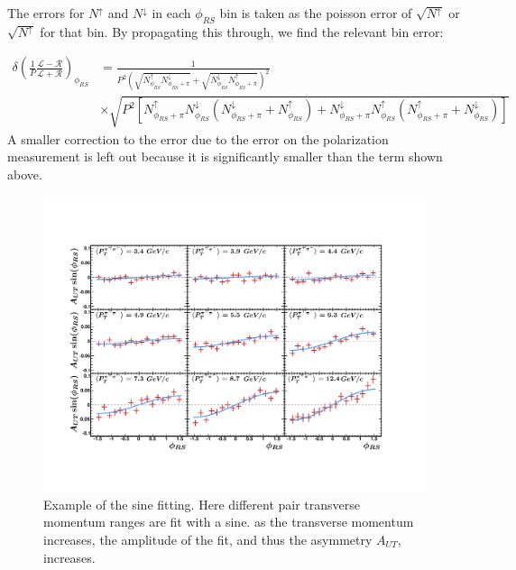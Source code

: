 \documentclass[abstract = on,listof=totoc, bibliography=totoc]{scrreprt}
\newcommand{\phirs}{\phi_{RS}}
\newcommand{\ptpair}{P_{T}^{\pi^+\pi^-}}
\newcommand{\pip}{\pi^+}
\newcommand{\pim}{\pi^-}
\newcommand{\pair}{$\pip\pim$ }
\newcommand{\nup}{N^\uparrow}
\newcommand{\ndw}{N^\downarrow}
\begin{document}
The errors for $N^\uparrow$ and $N^\downarrow$ in each $\phirs$ bin is taken as the poisson error of $\sqrt{N^\uparrow}$ or $\sqrt{N^\uparrow}$ for that bin. By propagating this through, we find the relevant bin error:

\begin{align}
\delta\left(\frac{1}{P}\frac{\mathcal{L} - \mathcal{R}}{\mathcal{L} + \mathcal{R}}\right)_{\phirs} & = \frac{1}{P^2 \left(\sqrt{\nup_{\phirs} \ndw_{\phirs+\pi}} + \sqrt{\ndw_{\phirs}\nup_{\phirs + \pi}}\right)^2} \nonumber \\
& \times \sqrt{P^2\left[   \nup_{\phirs+\pi} \ndw_{\phirs} \left( \ndw_{\phirs+\pi} + \nup_{\phirs}\right) +  \ndw_{\phirs+\pi} \nup_{\phirs} \left( \nup_{\phirs+\pi} + \ndw_{\phirs}\right) \right]}
\label{eq:binError}
\end{align}
%
A smaller correction to the error due to the error on the polarization measurement is left out because it is significantly smaller than the term shown above.



\begin{figure}
\begin{center}
\includegraphics[width = 1\textwidth]{sinFit3}
\caption[Sinusoid modulation of \pair pair produciton and fit for 9 $\ptpair$ bins]{Example of the sine fitting. Here different pair transverse momentum ranges are fit with a sine. as the transverse momentum increases, the amplitude of the fit, and thus the asymmetry $A_{UT}$, increases.}
\label{fig:sinFit}
\end{center}
\end{figure}
\end{document}
